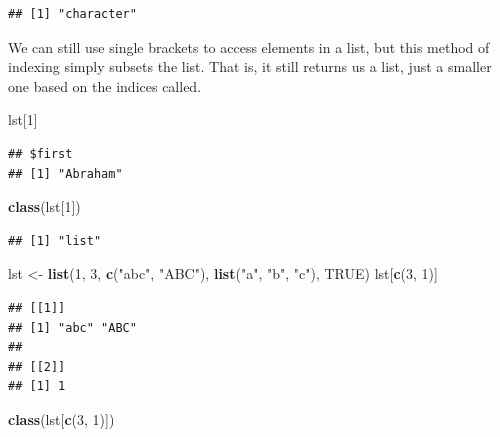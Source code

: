 \documentclass[
]{book}
\newenvironment{Shaded}{\begin{snugshade}}{\end{snugshade}}
\newcommand{\DecValTok}[1]{\textcolor[rgb]{0.00,0.00,0.81}{#1}}
\newcommand{\KeywordTok}[1]{\textcolor[rgb]{0.13,0.29,0.53}{\textbf{#1}}}
\newcommand{\NormalTok}[1]{#1}
\newcommand{\OtherTok}[1]{\textcolor[rgb]{0.56,0.35,0.01}{#1}}
\newcommand{\StringTok}[1]{\textcolor[rgb]{0.31,0.60,0.02}{#1}}
\begin{document}
\begin{verbatim}
## [1] "character"
\end{verbatim}

We can still use single brackets to access elements in a list, but this method of indexing simply subsets the list. That is, it still returns us a list, just a smaller one based on the indices called.

\begin{Shaded}
\begin{Highlighting}[]
\NormalTok{lst[}\DecValTok{1}\NormalTok{]}
\end{Highlighting}
\end{Shaded}

\begin{verbatim}
## $first
## [1] "Abraham"
\end{verbatim}

\begin{Shaded}
\begin{Highlighting}[]
\KeywordTok{class}\NormalTok{(lst[}\DecValTok{1}\NormalTok{])}
\end{Highlighting}
\end{Shaded}

\begin{verbatim}
## [1] "list"
\end{verbatim}

\begin{Shaded}
\begin{Highlighting}[]
\NormalTok{lst <-}\StringTok{ }\KeywordTok{list}\NormalTok{(}\DecValTok{1}\NormalTok{, }\DecValTok{3}\NormalTok{, }\KeywordTok{c}\NormalTok{(}\StringTok{"abc"}\NormalTok{, }\StringTok{"ABC"}\NormalTok{), }\KeywordTok{list}\NormalTok{(}\StringTok{"a"}\NormalTok{, }\StringTok{"b"}\NormalTok{, }\StringTok{"c"}\NormalTok{), }\OtherTok{TRUE}\NormalTok{)}
\NormalTok{lst[}\KeywordTok{c}\NormalTok{(}\DecValTok{3}\NormalTok{, }\DecValTok{1}\NormalTok{)]}
\end{Highlighting}
\end{Shaded}

\begin{verbatim}
## [[1]]
## [1] "abc" "ABC"
## 
## [[2]]
## [1] 1
\end{verbatim}

\begin{Shaded}
\begin{Highlighting}[]
\KeywordTok{class}\NormalTok{(lst[}\KeywordTok{c}\NormalTok{(}\DecValTok{3}\NormalTok{, }\DecValTok{1}\NormalTok{)])}
\end{Highlighting}
\end{Shaded}
\end{document}
